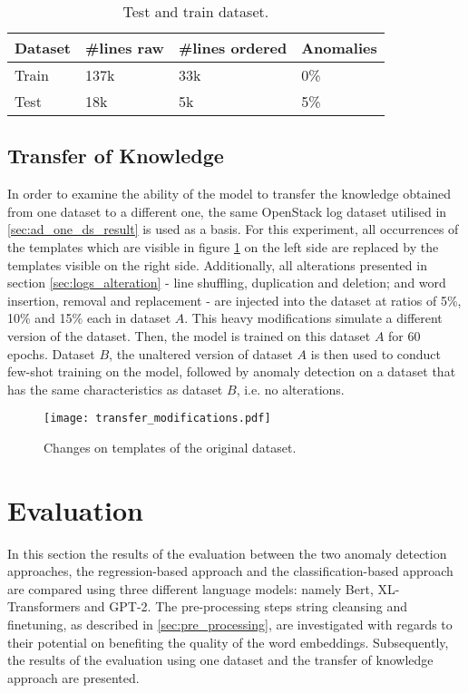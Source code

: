 \begin{table}[ht]
\centering
\begin{small}
\begin{tabular}{ p{1.3cm} p{1.8cm} p{2.3cm} p{1.7cm}}
\toprule
Dataset & \#lines raw & \#lines ordered & Anomalies\\
\midrule
Train & 137k & 33k & 0\%\\
Test & 18k & 5k & 5\%\\ 

\bottomrule
\end{tabular}
\caption{Test and train dataset.}
\label{tab:test_train_ds}
\end{small}
\end{table}



\subsection{Transfer of Knowledge \label{sec:transfer_learning_setup}}
In order to examine the ability of the model to transfer the knowledge obtained from one dataset to a different one, the same OpenStack log dataset utilised in \ref{sec:ad_one_ds_result} is used as a basis. For this experiment, all occurrences of the templates which are visible in figure \ref{fig:transfer_modifications} on the left side are replaced by the templates visible on the right side. Additionally, all alterations presented in section \ref{sec:logs_alteration} - line shuffling, duplication and deletion; and word insertion, removal and replacement - are injected into the dataset at ratios of 5\%, 10\% and 15\% each in dataset $A$. This heavy modifications simulate a different version of the dataset. Then, the model is trained on this dataset $A$ for 60 epochs. Dataset $B$, the unaltered version of dataset $A$ is then used to conduct few-shot training on the model, followed by anomaly detection on a dataset that has the same characteristics as dataset $B$, i.e. no alterations.

\begin{figure}[H]
  \centering
  \texttt{[image: transfer\_modifications.pdf]}\\
  \caption{Changes on templates of the original dataset.}
  \label{fig:transfer_modifications}
\end{figure}




\section{Evaluation\label{sec:evaluation}}
In this section the results of the evaluation between the two anomaly detection approaches, the regression-based approach and the classification-based approach are compared using three different language models: namely Bert, XL-Transformers and GPT-2. The pre-processing steps string cleansing and finetuning, as described in \ref{sec:pre_processing}, are investigated with regards to their potential on benefiting the quality of the word embeddings. Subsequently, the results of the evaluation using one dataset and the transfer of knowledge approach are presented.

